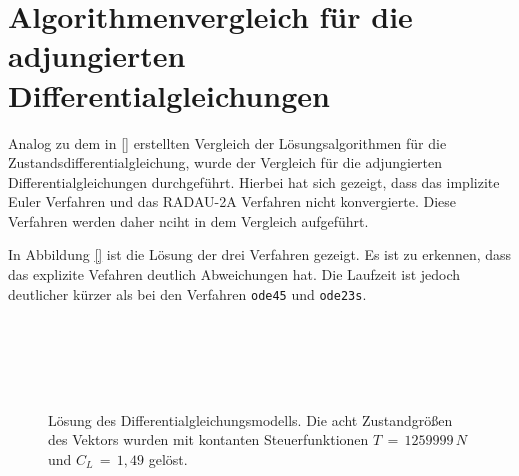 \chapter{Algorithmenvergleich für die adjungierten Differentialgleichungen}\label{appendix:methods}
Analog zu dem in \autoref{} erstellten Vergleich der Lösungsalgorithmen für die Zustandsdifferentialgleichung, wurde der Vergleich für die adjungierten Differentialgleichungen durchgeführt.
Hierbei hat sich gezeigt, dass das implizite Euler Verfahren und das RADAU-2A Verfahren nicht konvergierte. Diese Verfahren werden daher nciht in dem Vergleich aufgeführt.

In Abbildung \autoref{} ist die Lösung der drei Verfahren gezeigt. Es ist zu erkennen, dass das explizite Vefahren deutlich Abweichungen hat. Die Laufzeit ist jedoch deutlicher kürzer als bei den Verfahren \verb+ode45+ und \verb+ode23s+.

\begin{figure}[htbp]
    \centering 
    \qquad
     \\

    \qquad
     \\

    \qquad
     \\

    \qquad
     \\

    \caption{Lösung des Differentialgleichungsmodells. Die acht Zustandgrößen des Vektors wurden mit kontanten Steuerfunktionen \(T\,=\,1259999\,N\) und \(C_L\,=\,1,49\) gelöst.}
\end{figure}

